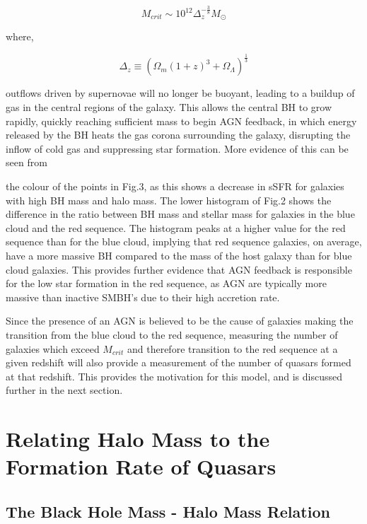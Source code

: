 \documentclass[12pt, twocolumn]{report}%
\begin{document}
\begin{equation}
    M_{crit}\sim10^{12}\Delta_{z}^{-\frac{3}{8}}M_\odot
\end{equation}

\noindent where,

\begin{equation}
    \Delta_z\equiv(\Omega_m(1+z)^3+\Omega_\Lambda)^{\frac{1}{3}}
\end{equation}

\noindent outflows driven by supernovae will no longer be buoyant, leading to a buildup of gas in the central regions of the galaxy. This allows the central BH to grow rapidly, quickly reaching sufficient mass to begin AGN feedback, in which energy released by the BH heats the gas corona surrounding the galaxy, disrupting the inflow of cold gas and suppressing star formation. More evidence of this can be seen from

\noindent the colour of the points in Fig.3, as this shows a decrease in sSFR for galaxies with high BH mass and halo mass. The lower histogram of Fig.2 shows the difference in the ratio between BH mass and stellar mass for galaxies in the blue cloud and the red sequence. The histogram peaks at a higher value for the red sequence than for the blue cloud, implying that red sequence galaxies, on average, have a more massive BH compared to the mass of the host galaxy than for blue cloud galaxies. This provides further evidence that AGN feedback is responsible for the low star formation in the red sequence, as AGN are typically more massive than inactive SMBH's due to their high accretion rate.\par

Since the presence of an AGN is believed to be the cause of galaxies making the transition from the blue cloud to the red sequence, measuring the number of galaxies which exceed $M_{crit}$ and therefore transition to the red sequence at a given redshift will also provide a measurement of the number of quasars formed at that redshift. This provides the motivation for this model, and is discussed further in the next section.

\section{Relating Halo Mass to the Formation Rate of Quasars}
\subsection{The Black Hole Mass - Halo Mass Relation}
\end{document}
